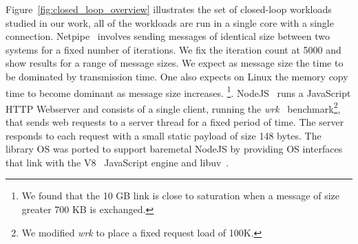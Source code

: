 Figure~\ref{fig:closed_loop_overview} illustrates the set of closed-loop workloads studied in our work, all of the workloads are run in a single core with a single connection. Netpipe~\cite{snell1996netpipe} involves sending messages of identical size between two systems for a fixed number of iterations. We fix the iteration count at 5000 and show results for a range of message sizes. We expect as message size the time to be dominated by transmission time. One also expects on Linux the memory copy time to become dominant as message size increases. \footnote{We found that the 10 GB link is close to saturation when a message of size greater 700 KB is exchanged.}. NodeJS~\cite{nodejs} runs a JavaScript HTTP Webserver and consists of a single client, running the \textit{wrk}~\cite{wrk} benchmark\footnote{We modified \textit{wrk} to place a fixed request load of 100K.}, that sends web requests to a server thread for a fixed period of time. The server responds to each request with a small static payload of size 148 bytes. The library OS was ported to support baremetal NodeJS by providing OS interfaces that link with the V8~\cite{v8} JavaScript engine and libuv~\cite{libuv}. 







